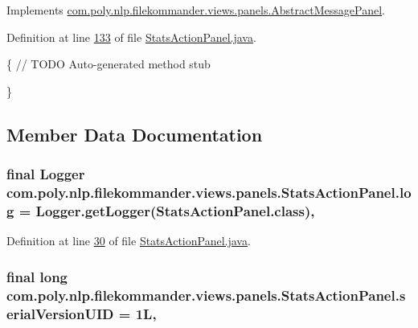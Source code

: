 Implements \hyperlink{classcom_1_1poly_1_1nlp_1_1filekommander_1_1views_1_1panels_1_1_abstract_message_panel_a305ad7e0b41448b92cfc567062fbb874}{com.\-poly.\-nlp.\-filekommander.\-views.\-panels.\-Abstract\-Message\-Panel}.



Definition at line \hyperlink{L133}{133} of file \hyperlink{}{Stats\-Action\-Panel.\-java}.


\begin{DoxyCode}
                                             \{
        \textcolor{comment}{// TODO Auto-generated method stub}
        
    \}
\end{DoxyCode}


\subsection{Member Data Documentation}
\hypertarget{classcom_1_1poly_1_1nlp_1_1filekommander_1_1views_1_1panels_1_1_stats_action_panel_a9d905505e7514da823b65ce32d31d22e}{
\subsubsection[{log}]{\setlength{\rightskip}{0pt plus 5cm}final Logger com.\-poly.\-nlp.\-filekommander.\-views.\-panels.\-Stats\-Action\-Panel.\-log = Logger.\-get\-Logger(Stats\-Action\-Panel.\-class)\hspace{0.3cm}{\ttfamily [static]}, {\ttfamily [private]}}}\label{classcom_1_1poly_1_1nlp_1_1filekommander_1_1views_1_1panels_1_1_stats_action_panel_a9d905505e7514da823b65ce32d31d22e}


Definition at line \hyperlink{L30}{30} of file \hyperlink{}{Stats\-Action\-Panel.\-java}.

\hypertarget{classcom_1_1poly_1_1nlp_1_1filekommander_1_1views_1_1panels_1_1_stats_action_panel_ae7f395a4db15fdb7194b11934cd0732a}{
\subsubsection[{serial\-Version\-U\-I\-D}]{\setlength{\rightskip}{0pt plus 5cm}final long com.\-poly.\-nlp.\-filekommander.\-views.\-panels.\-Stats\-Action\-Panel.\-serial\-Version\-U\-I\-D = 1\-L\hspace{0.3cm}{\ttfamily [static]}, {\ttfamily [private]}}}\label{classcom_1_1poly_1_1nlp_1_1filekommander_1_1views_1_1panels_1_1_stats_action_panel_ae7f395a4db15fdb7194b11934cd0732a}


